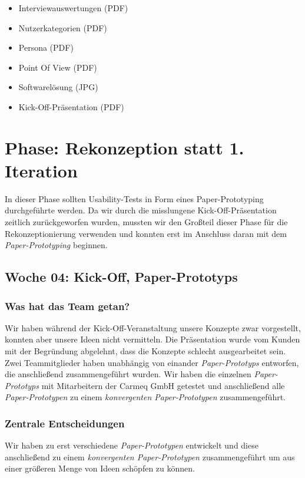 \documentclass{article}
\begin{document}
\begin{itemize}
\item Interviewauswertungen (PDF)
\item Nutzerkategorien (PDF)
\item Persona (PDF)
\item Point Of View (PDF)
\item Softwarel\"osung (JPG)
\item Kick-Off-Pr\"asentation (PDF)
\end{itemize}


\section{Phase: Rekonzeption statt 1. Iteration}

In dieser Phase sollten Usability-Tests in Form eines Paper-Prototyping durchgef\"uhrte werden. Da wir durch die misslungene Kick-Off-Pr\"asentation zeitlich zur\"uckgeworfen wurden, mussten wir den Gro\ss teil dieser Phase f\"ur die Rekonzeptionierung verwenden und konnten erst im Anschluss daran mit dem \textit{Paper-Prototyping} beginnen.

\subsection{Woche 04: Kick-Off, Paper-Prototyps}

\subsubsection{Was hat das Team getan?}

Wir haben w\"ahrend der Kick-Off-Veranstaltung unsere Konzepte zwar vorgestellt, konnten aber unsere Ideen nicht vermitteln. Die Pr\"asentation wurde vom Kunden mit der Begr\"undung abgelehnt, dass die Konzepte schlecht ausgearbeitet sein.\\
Zwei Teammitglieder haben unabh\"angig von einander \textit{Paper-Prototyps} entworfen, die anschlie\ss end zusammengef\"uhrt wurden. Wir haben die einzelnen \textit{Paper-Prototyps} mit Mitarbeitern der Carmeq GmbH getestet und anschlie\ss end alle \textit{Paper-Prototypen} zu einem \textit{konvergenten Paper-Prototypen} zusammengef\"uhrt.

\subsubsection{Zentrale Entscheidungen}

Wir haben zu erst verschiedene \textit{Paper-Prototypen} entwickelt und diese anschlie\ss end zu einem \textit{konvergenten Paper-Prototypen} zusammengef\"uhrt um aus einer gr\"o\ss eren Menge von Ideen sch\"opfen zu k\"onnen. 
\end{document}
